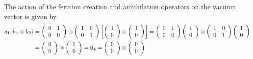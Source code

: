 \documentclass[aps,preprint]{revtex4}%
\begin{document}
The action of the fermion creation and annihilation operators on the vacuum
vector is given by
\begin{align}
a_{1}\left\vert h_{1}\otimes h_{2}\right\rangle  &  =\left(
\begin{array}
[c]{cc}%
0 & 1\\
0 & 0
\end{array}
\right)  \otimes\left(
\begin{array}
[c]{cc}%
1 & 0\\
0 & 1
\end{array}
\right)  \left[  \left(
\begin{array}
[c]{c}%
1\\
0
\end{array}
\right)  \otimes\left(
\begin{array}
[c]{c}%
1\\
0
\end{array}
\right)  \right]  =\left(
\begin{array}
[c]{cc}%
0 & 1\\
0 & 0
\end{array}
\right)  \left(
\begin{array}
[c]{c}%
1\\
0
\end{array}
\right)  \otimes\left(
\begin{array}
[c]{cc}%
1 & 0\\
0 & 1
\end{array}
\right)  \left(
\begin{array}
[c]{c}%
1\\
0
\end{array}
\right) \\
&  =\left(
\begin{array}
[c]{c}%
0\\
0
\end{array}
\right)  \otimes\left(
\begin{array}
[c]{c}%
1\\
0
\end{array}
\right)  =\mathbf{0}_{4}=\left(
\begin{array}
[c]{c}%
0\\
0
\end{array}
\right)  \otimes\left(
\begin{array}
[c]{c}%
0\\
0
\end{array}
\right)
\end{align}%
\end{document}
